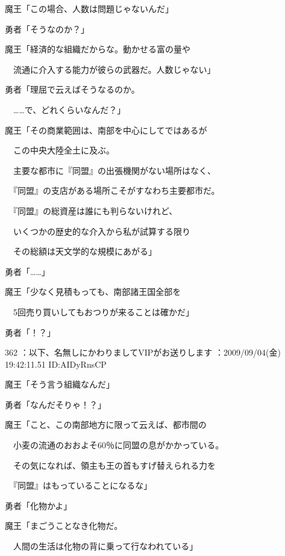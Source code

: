 \documentclass[a4j,twocolumn]{tarticle}
\begin{document}
魔王「この場合、人数は問題じゃないんだ」\par{} 
勇者「そうなのか？」 



魔王「経済的な組織だからな。動かせる富の量や\par{} 
　流通に介入する能力が彼らの武器だ。人数じゃない」 



勇者「理屈で云えばそうなるのか。\par{} 
　……で、どれくらいなんだ？」 



魔王「その商業範囲は、南部を中心にしてではあるが\par{} 
　この中央大陸全土に及ぶ。\par{} 
　主要な都市に『同盟』の出張機関がない場所はなく、\par{} 
　『同盟』の支店がある場所こそがすなわち主要都市だ。\par{} 
　『同盟』の総資産は誰にも判らないけれど、 \par{}
　いくつかの歴史的な介入から私が試算する限り\par{} 
　その総額は天文学的な規模にあがる」 



勇者「……」 



魔王「少なく見積もっても、南部諸王国全部を\par{} 
　5回売り買いしてもおつりが来ることは確かだ」 



勇者「！？」 

	
    
    

362 ：以下、名無しにかわりましてVIPがお送りします ：2009/09/04(金) 19:42:11.51 ID:AIDyRnsCP 


魔王「そう言う組織なんだ」\par{} 
勇者「なんだそりゃ！？」 



魔王「こと、この南部地方に限って云えば、都市間の\par{} 
　小麦の流通のおおよそ60％に同盟の息がかかっている。\par{} 
　その気になれば、領主も王の首もすげ替えられる力を\par{} 
　『同盟』はもっていることになるな」 



勇者「化物かよ」\par{} 
魔王「まごうことなき化物だ。\par{} 
　人間の生活は化物の背に乗って行なわれている」 
\end{document}
